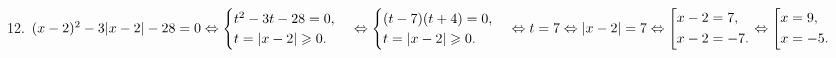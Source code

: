 12. $(x-2)^2-3|x-2|-28=0\Leftrightarrow \begin{cases}
t^2-3t-28=0,\\
t=|x-2|\geqslant0.\end{cases}\Leftrightarrow \begin{cases}
(t-7)(t+4)=0,\\
t=|x-2|\geqslant0.\end{cases}\Leftrightarrow t=7 \Leftrightarrow |x-2|=7 \Leftrightarrow \left[
\begin{gathered}
x-2=7, \hfill
\\
x-2=-7. \hfill
\\
\end{gathered}
\right.\Leftrightarrow\left[
\begin{gathered}
x=9, \hfill
\\
x=-5. \hfill
\\
\end{gathered}
\right.$\\
